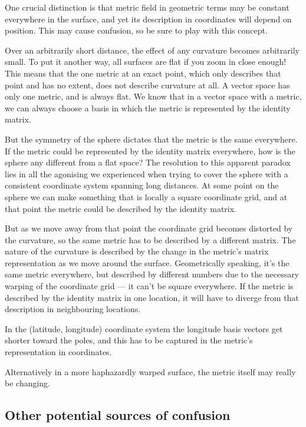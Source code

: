 One crucial distinction is that metric field in geometric terms may be constant everywhere in the surface, and yet its description in coordinates will depend on position. This may cause confusion, so be sure to play with this concept.

Over an arbitrarily short distance, the effect of any curvature becomes arbitrarily small. To put it another way, all surfaces are flat if you zoom in close enough! This means that the one metric at an exact point, which only describes that point and has no extent, does not describe curvature at all. A vector space has only one metric, and is always flat. We know that in a vector space with a metric, we can always choose a basis in which the metric is represented by the identity matrix.

But the symmetry of the sphere dictates that the metric is the same everywhere. If the metric could be represented by the identity matrix everywhere, how is the sphere any different from a flat space? The resolution to this apparent paradox lies in all the agonising we experienced when trying to cover the sphere with a consistent coordinate system spanning long distances. At some point on the sphere we can make something that is locally a square coordinate grid, and at that point the metric could be described by the identity matrix.

But as we move away from that point the coordinate grid becomes distorted by the curvature, so the same metric has to be described by a different matrix. The nature of the curvature is described by the change in the metric's matrix representation as we move around the surface. Geometrically speaking, it's the same metric everywhere, but described by different numbers due to the necessary warping of the coordinate grid --- it can't be square everywhere. If the metric is described by the identity matrix in one location, it will have to diverge from that description in neighbouring locations.

In the (latitude, longitude) coordinate system the longitude basis vectors get shorter toward the poles, and this has to be captured in the metric's representation in coordinates.

Alternatively in a more haphazardly warped surface, the metric itself may really be changing.

\subsection{Other potential sources of confusion}

